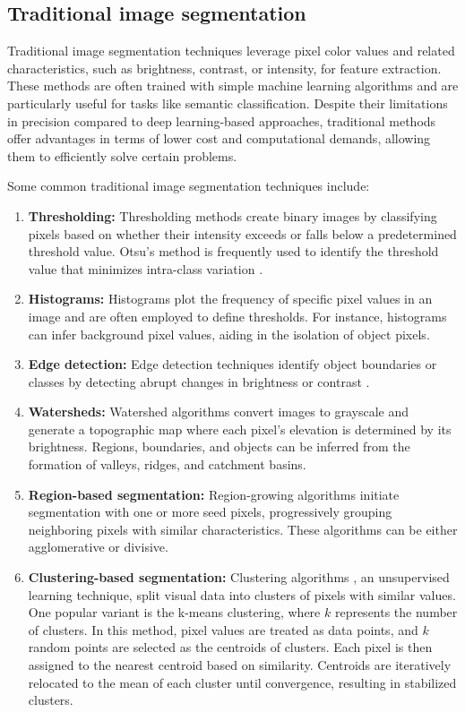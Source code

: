 \subsection{Traditional image segmentation}
Traditional image segmentation techniques leverage pixel color values and related characteristics, such as brightness, contrast, or intensity, for feature extraction. These methods are often trained with simple machine learning algorithms and are particularly useful for tasks like semantic classification. Despite their limitations in precision compared to deep learning-based approaches, traditional methods offer advantages in terms of lower cost and computational demands, allowing them to efficiently solve certain problems.

Some common traditional image segmentation techniques include:
\begin{enumerate}
  \item \textbf{Thresholding:} Thresholding methods create binary images by classifying pixels based on whether
  their intensity exceeds or falls below a predetermined threshold value. Otsu's method is frequently used to identify the threshold value that minimizes intra-class variation \cite{otsu1979}.
  \item \textbf{Histograms:} Histograms plot the frequency of specific pixel values in an image and are often employed to define thresholds. For instance, histograms can infer background pixel values, aiding in the isolation of object pixels.
  \item \textbf{Edge detection:} Edge detection techniques identify object boundaries or classes by detecting abrupt changes in brightness or contrast \cite{Edgedet1986}.
  \item \textbf{Watersheds:} Watershed algorithms \cite{Watershed1991} convert images to grayscale and generate a topographic map where each pixel's elevation is determined by its brightness. Regions, boundaries, and objects can be inferred from the formation of valleys, ridges, and catchment basins.
  \item \textbf{Region-based segmentation:} Region-growing algorithms \cite{RCNN2016} initiate segmentation with one or more seed pixels, progressively grouping neighboring pixels with similar characteristics. These algorithms can be either agglomerative or divisive.
  \item \textbf{Clustering-based segmentation:} Clustering algorithms \cite{ClusteringSeg1979}, an unsupervised
  learning technique, split visual data into clusters of pixels with similar values. One popular variant is the k-means
  clustering, where $k$ represents the number of clusters. In this method, pixel values are treated as data points, and $k$ random points are selected as the centroids of clusters. Each pixel is then assigned to the nearest centroid based on similarity. Centroids are iteratively relocated to the mean of each cluster until convergence, resulting in stabilized clusters.
\end{enumerate}

